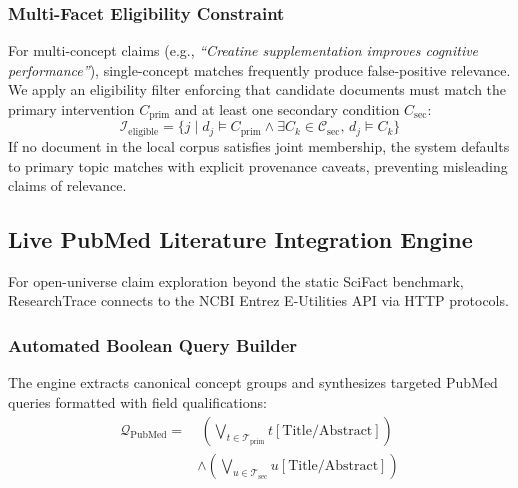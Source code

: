 \documentclass[conference]{IEEEtran}
\begin{document}
\subsubsection{Multi-Facet Eligibility Constraint}
For multi-concept claims (e.g., \textit{``Creatine supplementation improves cognitive performance''}), single-concept matches frequently produce false-positive relevance. We apply an eligibility filter enforcing that candidate documents must match the primary intervention $C_{\text{prim}}$ and at least one secondary condition $C_{\text{sec}}$:
\begin{equation}
\mathcal{I}_{\text{eligible}} = \{j \mid d_j \models C_{\text{prim}} \land \exists C_k \in \mathcal{C}_{\text{sec}},\, d_j \models C_k\}
\end{equation}
If no document in the local corpus satisfies joint membership, the system defaults to primary topic matches with explicit provenance caveats, preventing misleading claims of relevance.

\subsection{Live PubMed Literature Integration Engine}
For open-universe claim exploration beyond the static SciFact benchmark, ResearchTrace connects to the NCBI Entrez E-Utilities API via HTTP protocols.

\subsubsection{Automated Boolean Query Builder}
The engine extracts canonical concept groups and synthesizes targeted PubMed queries formatted with field qualifications:
\begin{equation}
\begin{split}
\mathcal{Q}_{\text{PubMed}} = &\ \left(\bigvee_{t \in \mathcal{T}_{\text{prim}}} t[\text{Title/Abstract}]\right) \\
&\land \left(\bigvee_{u \in \mathcal{T}_{\text{sec}}} u[\text{Title/Abstract}]\right)
\end{split}
\end{equation}
\end{document}
